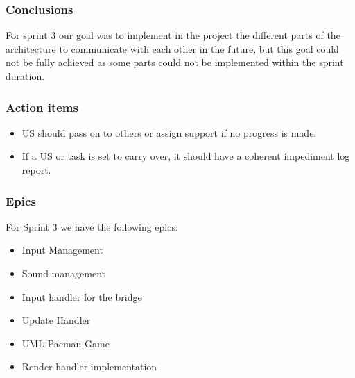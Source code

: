 \subsubsection{Conclusions}

For sprint 3 our goal was to implement in the project the different parts of the architecture to communicate with each other in the future, but this goal could not be fully achieved as some parts could not be implemented within the sprint duration.

\subsubsection{Action items}

\begin{itemize}
    \item US should pass on to others or assign support if no progress is made.
    \item If a US or task is set to carry over, it should have a coherent impediment log report.
\end{itemize}

\subsubsection{Epics}

For Sprint 3 we have the following epics:

\begin{itemize}
    \item Input Management
    \item Sound management
    \item Input handler for the bridge
    \item Update Handler
    \item UML Pacman Game
    \item Render handler implementation 
\end{itemize}
